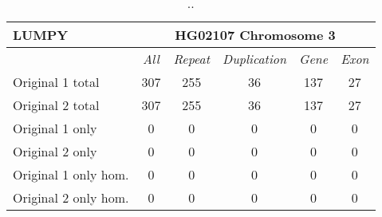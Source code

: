 \begin{table}[htb]
\caption{ .. }
\begin{center}
\begin{tabular}{|l|c||c|c|c|c|}
\hline
{\bf LUMPY} & \multicolumn{5}{|c|}{\bf HG02107 Chromosome 3} \\
\hline
\cline{2-6}
{\bf} & {\it All} & {\it Repeat} & {\it Duplication} & {\it Gene} & {\it Exon} \\
\hline
Original 1 total & 307 & 255 & 36 & 137 & 27 \\
\hline
Original 2 total & 307 & 255 & 36 & 137 & 27 \\
\hline
Original 1 only & 0 & 0 & 0 & 0 & 0\\ 
\hline
Original 2 only & 0 & 0 & 0 & 0 & 0\\
\hline
Original 1 only hom. & 0 & 0 & 0 & 0 & 0\\ 
\hline
Original 2 only hom. & 0 & 0 & 0 & 0 & 0\\  
\hline
\end{tabular}
\end{center}
\label{tab:orig-vs-orig2-lumpy}
\end{table}
